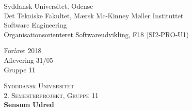 \documentclass[../main.tex]{subfiles}
\begin{document}


  
\begin{titlepage}
\begin{center}

\noindent
\begin{minipage}{0.6\textwidth}
\begin{flushleft} 
\footnotesize
Syddansk Universitet, Odense\\
Det Tekniske Fakultet, Mærsk Mc-Kinney Møller Instituttet \\
Software Engineering\\
Organisationsorienteret Softwareudvikling, F18 (SI2-PRO-U1) \\
\end{flushleft}
\end{minipage}%
\begin{minipage}{0.4\textwidth}
\begin{flushright} 
\small
Foråret 2018\\
Aflevering 31/05\\
Gruppe 11
\end{flushright}
\end{minipage}

\vspace*{50px}

\textsc{\LARGE Sydddansk Universitet}\\[0.5cm]

\textsc{\Large 2. Semesterprojekt, Gruppe 11}\\[0.5cm]

\vspace*{50px}
{ \huge \bfseries Sensum Udred \\[0.4cm] }

\vspace*{150px}


\end{center}
\end{titlepage}
\end{document}
